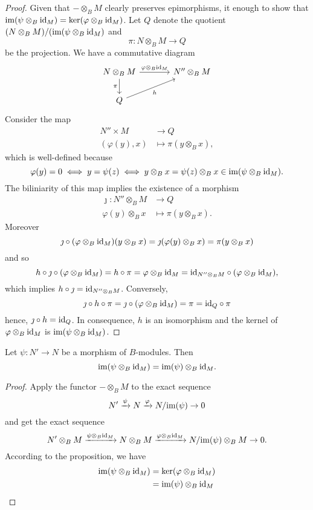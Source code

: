 \begin{proof}
    Given that $-\otimes_BM$ clearly preserves epimorphisms, it enough to show that $\text{\rm im}(\psi\otimes_B\text{\rm id}_M)=\ker(\varphi\otimes_B\text{\rm id}_M)$. Let $Q$ denote the quotient $(N\otimes_BM)/(\text{\rm im}(\psi\otimes_B\text{\rm id}_M)$ and
    $$
        \pi\colon N\otimes_BM\to Q
    $$
    be the projection. We have a commutative diagram
    $$
        \begin{tikzcd}[column sep=large]
            N\otimes_BM
                    \arrow[r,"\varphi\otimes_B\id_M"]
                    \arrow[d,"\pi"']
                &N''\otimes_BM\\
            Q
                    \arrow[ru,"h"']
        \end{tikzcd}
    $$
    Consider the map
    \begin{align*}
        N''\times M&\to Q\\
        (\varphi(y),x)&\mapsto \pi(y\otimes_Bx),
    \end{align*}
    which is well-defined because
    $$
        \varphi(y)=0 \iff y=\psi(z)
            \iff y\otimes_Bx = \psi(z)\otimes_Bx
                \in\text{\rm im}(\psi\otimes_B\text{\rm id}_M).
    $$
    The biliniarity of this map implies the existence of a morphism
    \begin{align*}
        \jmath\colon N''\otimes_BM&\to Q\\
        \varphi(y)\otimes_Bx&\mapsto \pi(y\otimes_Bx).
    \end{align*}
    Moreover
    $$
        \jmath\circ(\varphi\otimes_B\text{\rm id}_M)(y\otimes_Bx)
            = \jmath(\varphi(y)\otimes_Bx)
            = \pi(y\otimes_Bx)
    $$
    and so
    $$
        h\circ\jmath\circ(\varphi\otimes_B\text{\rm id}_M)
            = h\circ\pi
            = \varphi\otimes_B\text{\rm id}_M
            = \text{\rm id}_{N''\otimes_BM}\circ(\varphi\otimes_B\text{\rm id}_M),
    $$
    which implies $h\circ\jmath=\text{\rm id}_{N''\otimes_BM}$. Conversely,
    $$
        \jmath\circ h\circ\pi = \jmath\circ(\varphi\otimes_B\text{\rm id}_M)
            = \pi = \text{\rm id}_Q\circ\pi
    $$
    hence, $\jmath\circ h=\text{\rm id}_Q$. In consequence, $h$ is an isomorphism and the kernel of $\varphi\otimes_B\text{\rm id}_M$ is $\text{\rm im}(\psi\otimes_B\text{\rm id}_M)$.
\end{proof}

\begin{cor}
    Let $\psi\colon N'\to N$ be a morphism of $B$-modules. Then
    $$
        \text{\rm im}(\psi\otimes_B\text{\rm id}_M)=\text{\rm im}(\psi)\otimes_B\text{\rm id}_M.
    $$
\end{cor}

\begin{proof}
    Apply the functor $-\otimes_BM$ to the exact sequence 
    $$
        N'\xrightarrow{\psi}N\xrightarrow{\varphi}N/\text{\rm im}(\psi)\to0
    $$
    and get the exact sequence
    $$
        N'\otimes_BM\xrightarrow{\psi\otimes_B\text{\rm id}_M}
        N\otimes_BM\xrightarrow{\varphi\otimes_B\text{\rm id}_M} N/\text{\rm im}(\psi)\otimes_BM\to0.
    $$
    According to the proposition, we have
    \begin{align*}
        \text{\rm im}(\psi\otimes_B\text{\rm id}_M) &= \ker(\varphi\otimes_B\text{\rm id}_M)\\
            &= \text{\rm im}(\psi)\otimes_B\text{\rm id}_M
    \end{align*}
\end{proof}

